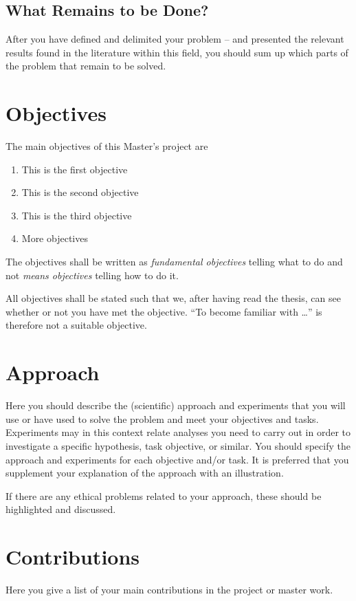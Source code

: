 \documentclass[../Main/thesis.tex]{subfiles}
\begin{document}
\subsection*{What Remains to be Done?}
After you have defined and delimited your problem -- and presented the relevant results found in the literature within this field, you should sum up which parts of the problem that remain to be solved.
\section{Objectives}
\label{sec:objectives}
The main objectives of this Master's project are
\begin{enumerate}
\item This is the first objective
\item This is the second objective
\item This is the third objective
\item More objectives
\end{enumerate}

The objectives shall be written as \emph{fundamental objectives} telling what to do and not \emph{means objectives} telling how to do it.

All objectives shall be stated such that we, after having read the thesis, can see whether or not you have met the objective. 
``To become familiar with \ldots'' is therefore not a suitable objective.

\section{Approach}
\label{sec:approach}
Here you should describe the (scientific) approach and experiments that you will use or have used to solve the problem and meet your objectives and tasks. 
Experiments may in this context relate analyses you need to carry out in order to investigate a specific hypothesis, task objective, or similar. 
You should specify the approach and experiments for each objective and/or task. 
It is preferred that you supplement your explanation of the approach with an illustration.

If there are any ethical problems related to your approach, these should be highlighted and discussed.

\section{Contributions}
\label{sec:contributions}
Here you give a list of your main contributions in the project or master work.
\end{document}
